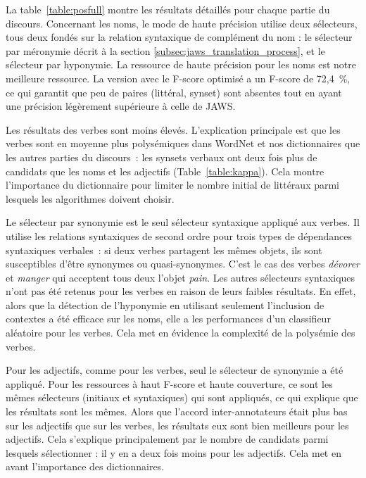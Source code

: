 La table~\ref{table:posfull} montre les résultats détaillés pour chaque partie
du discours. Concernant les noms, le mode de haute précision utilise deux
sélecteurs, tous deux fondés sur la relation syntaxique de complément du nom :
le sélecteur par méronymie décrit à la section
\ref{subsec:jaws_translation_process}, et le sélecteur par hyponymie. La
ressource de haute précision pour les noms est notre meilleure ressource. La
version avec le F-score optimisé a un F-score de 72,4~\%, ce qui garantit que
peu de paires (littéral, synset) sont absentes tout en ayant une précision
légèrement supérieure à celle de JAWS.

Les résultats des verbes sont moins élevés. L'explication principale est que
les verbes sont en moyenne plus polysémiques dans WordNet et nos dictionnaires
que les autres parties du discours~: les synsets verbaux ont deux fois plus de
candidats que les noms et les adjectifs (Table~\ref{table:kappa}). Cela montre
l'importance du dictionnaire pour limiter le nombre initial de littéraux parmi
lesquels les algorithmes doivent choisir.

Le sélecteur par synonymie est le seul sélecteur syntaxique appliqué aux
verbes. Il utilise les relations syntaxiques de second ordre pour trois types
de dépendances syntaxiques verbales~: si deux verbes partagent les mêmes
objets, ils sont susceptibles d'être synonymes ou quasi-synonymes. C'est le cas
des verbes \textit{dévorer} et \textit {manger} qui acceptent tous deux l'objet
\textit{pain}. Les autres sélecteurs syntaxiques n'ont pas été retenus pour les
verbes en raison de leurs faibles résultats. En effet, alors que la détection
de l'hyponymie en utilisant seulement l'inclusion de contextes a été efficace
sur les noms, elle a les performances d'un classifieur aléatoire pour les
verbes. Cela met en évidence la complexité de la polysémie des verbes.

Pour les adjectifs, comme pour les verbes, seul le sélecteur de synonymie a été
appliqué. Pour les ressources à haut F-score et haute couverture, ce sont les
mêmes sélecteurs (initiaux et syntaxiques) qui sont appliqués, ce qui explique
que les résultats sont les mêmes. Alors que l'accord inter-annotateurs était
plus bas sur les adjectifs que sur les verbes, les résultats eux sont bien
meilleurs pour les adjectifs. Cela s'explique principalement par le nombre de
candidats parmi lesquels sélectionner : il y en a deux fois moins pour les
adjectifs. Cela met en avant l'importance des dictionnaires.

